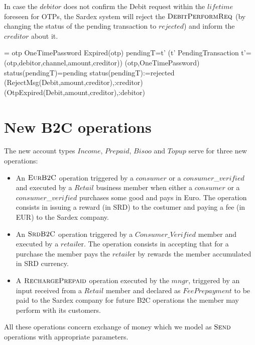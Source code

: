 In case the $debitor$ does not confirm the Debit request within the $lifetime$ foreseen for OTPs, the Sardex system will reject the $\hbox{\sc DebitPerformReq}$ (by changing the status of the pending transaction to $rejected$) and inform the $creditor$ about it.

\begin{asm}  
 =\+           
  \IF otp \in OneTimePassword \AND Expired(otp)  \THEN \+
  \LET pendingT=\iota t' (t'  \in PendingTransaction \AND 
       t'=(otp,debitor,channel,amount,creditor))\+
       (otp,OneTimePassword) \\
      \IF status(pendingT)=pending \THEN \+
         status(pendingT):=rejected\\
         (RejectMsg(Debit,amount,creditor),\TO :creditor)\\  
         (OtpExpired(Debit,amount,creditor),\TO :debitor)  
\end{asm}

\section{New B2C operations}
\label{sect:userops}

The new account types $Income$, $Prepaid$, $Bisoo$ and $Topup$ serve for three new operations:
\begin{itemize}
	\item An $\hbox{\sc EurB2C}$ operation triggered by a $consumer$ or a $consumer$\_$verified$ and executed by a $Retail$ business member when either a $consumer$ or a $consumer$\_$verified$ purchases some good and pays in Euro. The operation consists in issuing a reward (in SRD) to the costumer and paying a fee (in EUR) to the Sardex company.
		
	\item An $\hbox{\sc SrdB2C}$ operation triggered by a $Consumer\_Verified$ member and executed by a $retail$er. The operation consists in accepting that for a purchase the member pays the $retail$er by rewards the member accumulated in SRD currency. 
	
	\item  A $\hbox{\sc RechargePrepaid}$ operation executed by the $mngr$, triggered by an input received from a $Retail$ member and declared as $FeePrepayment$ to be paid to the Sardex company for future B2C operations the member may perform with its customers.
	\end{itemize}
All these operations concern exchange of money which we model as $\hbox{\sc Send}$ operations with appropriate parameters.


